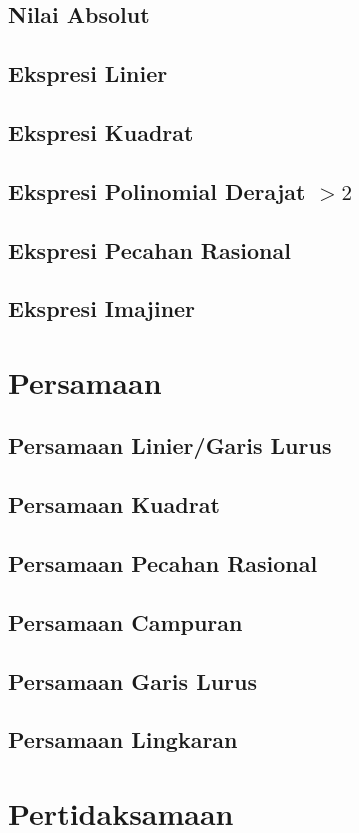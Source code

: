 \documentclass[12pt,a4paper,twoside,openany]{book}
\begin{document}
\section{Nilai Absolut}
\section{Ekspresi Linier}
\section{Ekspresi Kuadrat}
\section{Ekspresi Polinomial Derajat $>2$}
\section{Ekspresi Pecahan Rasional}
\section{Ekspresi Imajiner}

\chapter{Persamaan}
\section{Persamaan Linier/Garis Lurus}
\section{Persamaan Kuadrat}
\section{Persamaan Pecahan Rasional}
\section{Persamaan Campuran}
\section{Persamaan Garis Lurus}
\section{Persamaan Lingkaran}

\chapter{Pertidaksamaan}
\end{document}
